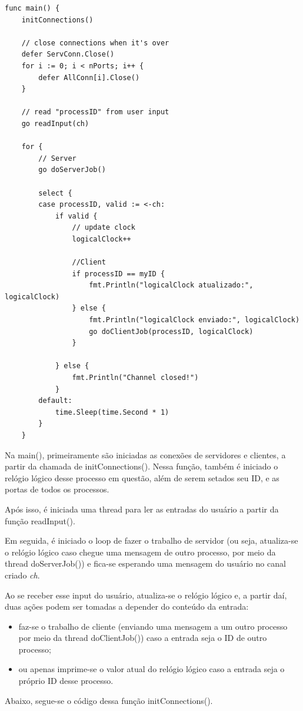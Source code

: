 \documentclass[conference]{IEEEtran}
\begin{document}
\begin{lstlisting}
func main() {
	initConnections()

	// close connections when it's over
	defer ServConn.Close()
	for i := 0; i < nPorts; i++ {
		defer AllConn[i].Close()
	}

	// read "processID" from user input
	go readInput(ch)

	for {
		// Server
		go doServerJob()
		
		select {
		case processID, valid := <-ch:
			if valid {
				// update clock
				logicalClock++
				
				//Client
				if processID == myID {
					fmt.Println("logicalClock atualizado:", logicalClock)
				} else {
					fmt.Println("logicalClock enviado:", logicalClock)
					go doClientJob(processID, logicalClock)
				}

			} else {
				fmt.Println("Channel closed!")
			}
		default:
			time.Sleep(time.Second * 1)
		}
	}
\end{lstlisting}

	Na main(), primeiramente são iniciadas as conexões de servidores e clientes, a partir da chamada de initConnections(). Nessa função, também é iniciado o relógio lógico desse processo em questão, além de serem setados seu ID, e as portas de todos os processos. 
	
	Após isso, é iniciada uma thread para ler as entradas do usuário a partir da função readInput().
	
	Em seguida, é iniciado o loop de fazer o trabalho de servidor (ou seja, atualiza-se o relógio lógico caso chegue uma mensagem de outro processo, por meio da thread doServerJob()) e fica-se esperando uma mensagem do usuário no canal criado \textit{ch}.
	
	Ao se receber esse input do usuário, atualiza-se o relógio lógico e, a partir daí, duas ações podem ser tomadas a depender do conteúdo da entrada: 
	
\begin{itemize}
\item faz-se o trabalho de cliente (enviando uma mensagem a um outro processo por meio da thread doClientJob()) caso a entrada seja o ID de outro processo;
\item ou apenas imprime-se o valor atual do relógio lógico caso a entrada seja o próprio ID desse processo.
\end{itemize}
	
	Abaixo, segue-se o código dessa função initConnections().
	
\end{document}
